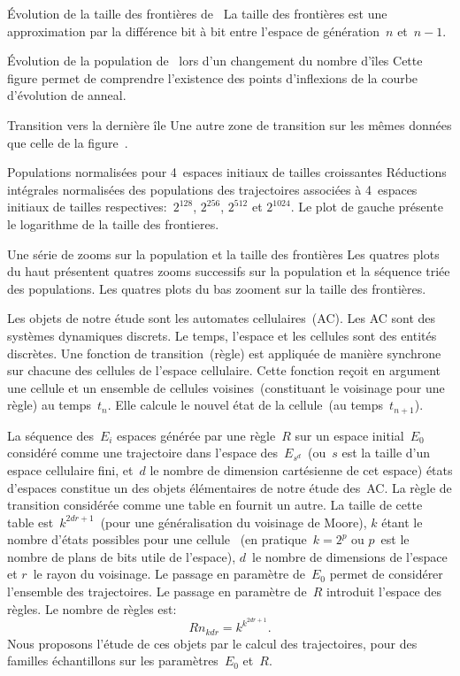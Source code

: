 %
{}%
{\'Evolution de la taille des fronti\`eres de~}%
{La taille des fronti\`eres est une approximation par la diff\'erence bit
  \`a bit entre l'espace de g\'en\'eration~$n$ et~$n-1$.}

%
{}%
{\'Evolution de la population de~ lors
  d'un changement du nombre d'\^iles}%
{Cette figure permet de comprendre l'existence des points d'inflexions
  de la courbe d'\'evolution de anneal.}

%
{}%
{Transition vers la derni\`ere \^ile}%
{Une autre zone de transition sur les m\^emes donn\'ees que celle de la
  figure~.}

%
{}%
{Populations normalis\'ees pour 4~espaces initiaux de tailles crois\-santes}%
{R\'eductions int\'egrales normalis\'ees des populations des trajectoires
  associ\'ees \`a 4~espaces initiaux de tailles respectives:~$2^{128}$,
  $2^{256}$, $2^{512}$ et $2^{1024}$. %
  Le plot de gauche pr\'esente le logarithme de la taille des frontieres.}

%
{}%
{Une s\'erie de zooms sur la population et la taille des fronti\`eres}%
{Les quatres plots du haut pr\'esentent quatres zooms successifs sur la
  population et la s\'equence tri\'ee des populations. %
  Les quatres plots du bas zooment sur la taille des fronti\`eres.}

Les objets de notre \'etude sont les automates cellulaires~(AC). %
Les AC sont des syst\`emes dynamiques discrets. %
Le temps, l'espace et les cellules sont des entit\'es discr\`etes. %
Une fonction de transition~(r\`egle) est appliqu\'ee de mani\`ere synchrone
sur chacune des cellules de l'espace cellulaire. %
Cette fonction re\c{c}oit en argument une cellule et un ensemble de
cellules voisines~(constituant le voisinage pour une r\`egle) %
au temps~$t_n$. %
Elle calcule le nouvel \'etat de la cellule~(au temps~$t_{n+1}$). %

La s\'equence des~$E_i$ espaces g\'en\'er\'ee par une r\`egle~$R$ sur un espace
initial~$E_0$ consid\'er\'e comme une trajectoire dans l'espace
des~$E_{s^d}$~(ou~$s$ est la taille d'un espace cellulaire fini, %
et~$d$ le nombre de dimension cart\'esienne de cet espace) \'etats d'espaces
constitue un des objets \'el\'ementaires de notre \'etude des~AC\@. %
La r\`egle de transition consid\'er\'ee comme une table en fournit un autre. %
La taille de cette table est~$k^{2dr+1}$~(pour une g\'en\'eralisation du
voisinage de Moore), %
$k$ \'etant le nombre d'\'etats possibles pour une cellule~%
(en pratique~$k=2^p$ ou $p$~est le nombre de plans de bits utile de
l'espace), $d$~le nombre de dimensions de l'espace et $r$~le rayon du
voisinage. %
Le passage en param\`etre de~$E_0$ permet de consid\'erer l'ensemble des
trajectoires. %
Le passage en param\`etre de~$R$ introduit l'espace des r\`egles. %
Le nombre de r\`egles est:
\begin{equation}
  Rn_{kdr} = k^{k^{2dr+1}}. %
  \label{rule-count}
\end{equation}
Nous proposons l'\'etude de ces objets par le calcul des trajectoires,
pour des familles \'echantillons sur les param\`etres~$E_0$ et~$R$. %

